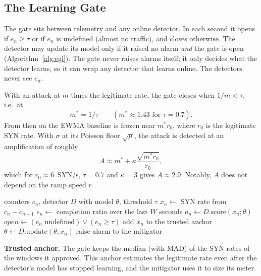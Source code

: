 \documentclass[conference]{IEEEtran}
\begin{document}
\subsection{The Learning Gate}
The gate sits between telemetry and any online detector. In each second it opens if $e_n \ge \tau$ or if $e_n$ is undefined (almost no traffic), and closes otherwise. The detector may update its model only if it raised no alarm \emph{and} the gate is open (Algorithm~\ref{alg:egl}). The gate never raises alarms itself; it only decides what the detector learns, so it can wrap any detector that learns online. The detectors never see $e_n$.

With an attack at $m$ times the legitimate rate, the gate closes when $1/m < \tau$, i.e.\ at
\begin{equation}
m^{*} = 1/\tau \qquad (m^{*} \approx 1.43 \text{ for } \tau = 0.7). \label{eq:mstar}
\end{equation}
From then on the EWMA baseline is frozen near $m^{*} r_0$, where $r_0$ is the legitimate SYN rate. With $\sigma$ at its Poisson floor $\sqrt{\mu}$, the attack is detected at an amplification of roughly
\begin{equation}
A \approx m^{*} + \kappa \frac{\sqrt{m^{*} r_0}}{r_0} , \label{eq:pred}
\end{equation}
which for $r_0 \approx 6$~SYN/s, $\tau = 0.7$ and $\kappa = 3$ gives $A \approx 2.9$. Notably, $A$ does not depend on the ramp speed $r$.

\begin{algorithm}[t]
\caption{Evidence-gated detection, executed every second}\label{alg:egl}
\begin{algorithmic}[1]
\Require counters $c_n$, detector $D$ with model $\theta$, threshold $\tau$
\State $x_n \gets$ SYN rate from $c_n - c_{n-1}$
\State $e_n \gets$ completion ratio over the last $W$ seconds 
\State $a_n \gets D.\mathrm{score}(x_n; \theta)$ 
\State $open \gets (e_n \text{ undefined}) \lor (e_n \ge \tau)$
 add $x_n$ to the trusted anchor \EndIf
{} $\theta \gets D.\mathrm{update}(\theta, x_n)$ \EndIf
{} raise alarm to the mitigator \EndIf
\end{algorithmic}
\end{algorithm}

\textbf{Trusted anchor.} The gate keeps the median (with MAD) of the SYN rates of the windows it approved. This anchor estimates the legitimate rate even after the detector's model has stopped learning, and the mitigator uses it to size its meter.
\end{document}
